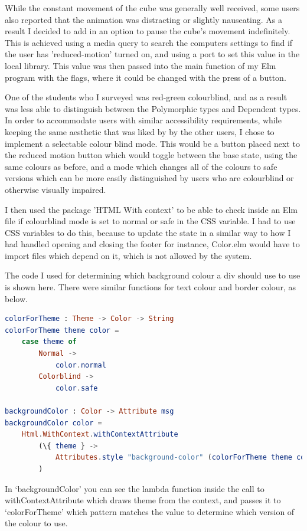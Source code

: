\documentclass{l4proj}
\begin{document}
While the constant movement of the cube was generally well received, some users also reported that the animation was distracting or slightly nauseating.  As a result I decided to add in an option to pause the cube's movement indefinitely.  This is achieved using a media query to search the computers settings to find if the user has 'reduced-motion' turned on, and using a port to set this value in the local library.  This value was then passed into the main function of my Elm program with the flags, where it could be changed with the press of a button.

One of the students who I surveyed was red-green colourblind, and as a result was less able to distinguish between the Polymorphic types and Dependent types.  In order to accommodate users with similar accessibility requirements, while keeping the same aesthetic that was liked by by the other users, I chose to implement a selectable colour blind mode.  This would be a button placed next to the reduced motion button which would toggle between the base state, using the same colours as before, and a mode which changes all of the colours to safe versions which can be more easily distinguished by users who are colourblind or otherwise visually impaired.

I then used the package 'HTML With context' to be able to check inside an Elm file if colourblind mode is set to normal or safe in the CSS variable.  I had to use CSS variables to do this, because to update the state in a similar way to how I had handled opening and closing the footer for instance, Color.elm would have to import files which depend on it, which is not allowed by the system.

The code I used for determining which background colour a div should use to use is shown here.  There were similar functions for text colour and border colour, as below.

\begin{lstlisting}[language = Elm]
colorForTheme : Theme -> Color -> String
colorForTheme theme color =
    case theme of
        Normal ->
            color.normal
        Colorblind ->
            color.safe

backgroundColor : Color -> Attribute msg
backgroundColor color =
    Html.WithContext.withContextAttribute
        (\{ theme } ->
            Attributes.style "background-color" (colorForTheme theme color)
        )
\end{lstlisting}

In `backgroundColor' you can see the lambda function inside the call to withContextAttribute which draws theme from the context, and passes it to `colorForTheme' which pattern matches the value to determine which version of the colour to use.
\end{document}
